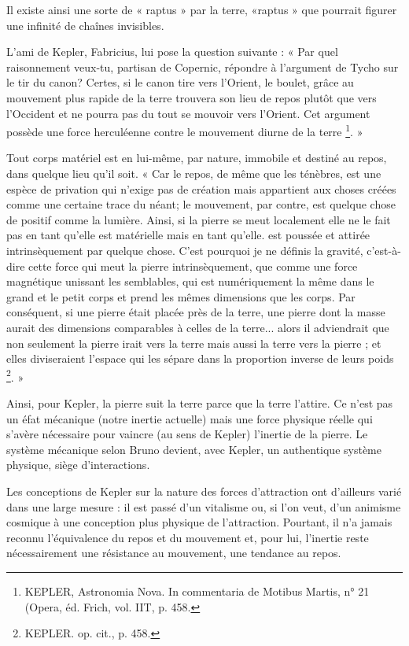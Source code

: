 Il existe ainsi une sorte de « raptus » par la terre, «raptus » que
pourrait figurer une infinité de chaînes invisibles.

L’ami de Kepler, Fabricius, lui pose la question suivante : « Par
quel raisonnement veux-tu, partisan de Copernic, répondre à l’argument
de Tycho sur le tir du canon? Certes, si le canon tire vers l’Orient, le
boulet, grâce au mouvement plus rapide de la terre trouvera son lieu de
repos plutôt que vers l’Occident et ne pourra pas du tout se mouvoir
vers l’Orient. Cet argument possède une force herculéenne contre le
mouvement diurne de la terre \footnote{KEPLER, Astronomia Nova. In commentaria de Motibus Martis, n° 21 (Opera,
éd. Frich, vol. IIT, p. 458.}. »

Tout corps matériel est en lui-même, par nature, immobile et destiné
au repos, dans quelque lieu qu’il soit. « Car le repos, de même que
les ténèbres, est une espèce de privation qui n’exige pas de création mais
appartient aux choses créées comme une certaine trace du néant; le mouvement,
par contre, est quelque chose de positif comme la lumière. Ainsi,
si la pierre se meut localement elle ne le fait pas en tant qu’elle est matérielle
mais en tant qu’elle. est poussée et attirée intrinsèquement par
quelque chose. C’est pourquoi je ne définis la gravité, c’est-à-dire cette
force qui meut la pierre intrinsèquement, que comme une force magnétique
unissant les semblables, qui est numériquement la même dans le
grand et le petit corps et prend les mêmes dimensions que les corps.
Par conséquent, si une pierre était placée près de la terre, une pierre dont
la masse aurait des dimensions comparables à celles de la terre... alors
il adviendrait que non seulement la pierre irait vers la terre mais aussi la
terre vers la pierre ; et elles diviseraient l’espace qui les sépare dans la
proportion inverse de leurs poids \footnote{KEPLER. op. cit., p. 458.}. »

Ainsi, pour Kepler, la pierre suit la terre parce que la terre l’attire.
Ce n’est pas un éfat mécanique (notre inertie actuelle) mais une force
physique réelle qui s’avère nécessaire pour vaincre (au sens de Kepler)
l’inertie de la pierre. Le système mécanique selon Bruno devient, avec
Kepler, un authentique système physique, siège d’interactions.

Les conceptions de Kepler sur la nature des forces d’attraction ont
d’ailleurs varié dans une large mesure : il est passé d’un vitalisme ou, si
l’on veut, d’un animisme cosmique à une conception plus physique de
l'attraction. Pourtant, il n’a jamais reconnu l’équivalence du repos et du
mouvement et, pour lui, l’inertie reste nécessairement une résistance au
mouvement, une tendance au repos.

